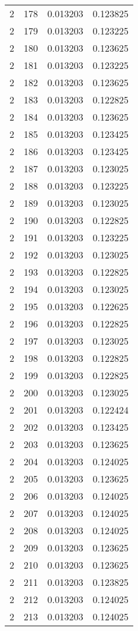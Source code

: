 \begin{longtable}{rrrr}
2 & 178 & 0.013203 & 0.123825 \\
2 & 179 & 0.013203 & 0.123225 \\
2 & 180 & 0.013203 & 0.123625 \\
2 & 181 & 0.013203 & 0.123225 \\
2 & 182 & 0.013203 & 0.123625 \\
2 & 183 & 0.013203 & 0.122825 \\
2 & 184 & 0.013203 & 0.123625 \\
2 & 185 & 0.013203 & 0.123425 \\
2 & 186 & 0.013203 & 0.123425 \\
2 & 187 & 0.013203 & 0.123025 \\
2 & 188 & 0.013203 & 0.123225 \\
2 & 189 & 0.013203 & 0.123025 \\
2 & 190 & 0.013203 & 0.122825 \\
2 & 191 & 0.013203 & 0.123225 \\
2 & 192 & 0.013203 & 0.123025 \\
2 & 193 & 0.013203 & 0.122825 \\
2 & 194 & 0.013203 & 0.123025 \\
2 & 195 & 0.013203 & 0.122625 \\
2 & 196 & 0.013203 & 0.122825 \\
2 & 197 & 0.013203 & 0.123025 \\
2 & 198 & 0.013203 & 0.122825 \\
2 & 199 & 0.013203 & 0.122825 \\
2 & 200 & 0.013203 & 0.123025 \\
2 & 201 & 0.013203 & 0.122424 \\
2 & 202 & 0.013203 & 0.123425 \\
2 & 203 & 0.013203 & 0.123625 \\
2 & 204 & 0.013203 & 0.124025 \\
2 & 205 & 0.013203 & 0.123625 \\
2 & 206 & 0.013203 & 0.124025 \\
2 & 207 & 0.013203 & 0.124025 \\
2 & 208 & 0.013203 & 0.124025 \\
2 & 209 & 0.013203 & 0.123625 \\
2 & 210 & 0.013203 & 0.123625 \\
2 & 211 & 0.013203 & 0.123825 \\
2 & 212 & 0.013203 & 0.124025 \\
2 & 213 & 0.013203 & 0.124025 \\

\end{longtable}
